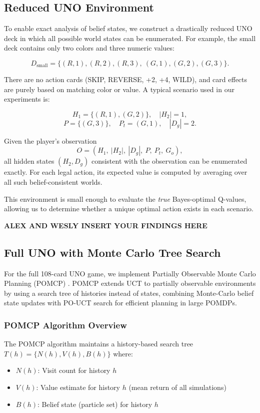 \documentclass[journal,transmag]{IEEEtran}
\begin{document}
\subsection{Reduced UNO Environment}

To enable exact analysis of belief states, we construct a drastically
reduced UNO deck in which all possible world states can be enumerated.
For example, the small deck contains only two colors and three numeric values:

\[
D_{\text{small}} =
\{(R,1), (R,2), (R,3),\ (G,1), (G,2), (G,3)\}.
\]

There are no action cards (SKIP, REVERSE, +2, +4, WILD), and card effects
are purely based on matching color or value. A typical scenario used in
our experiments is:

\[
H_1 = \{(R,1), (G,2)\},\quad |H_2| = 1,
\]
\[
P = \{(G,3)\},\quad P_t = (G,1),\quad |D_g| = 2.
\]

Given the player's observation
\[
O = (H_1,\ |H_2|,\ |D_g|,\ P,\ P_t,\ G_o),
\]
all hidden states \((H_2, D_g)\) consistent with the observation can be
enumerated exactly. For each legal action, its expected value is computed
by averaging over all such belief-consistent worlds.

This environment is small enough to evaluate the \emph{true}
Bayes-optimal Q-values, allowing us to determine whether a unique
optimal action exists in each scenario.

\textbf{ALEX AND WESLY INSERT YOUR FINDINGS HERE}


\subsection{Full UNO with Monte Carlo Tree Search}

For the full 108-card UNO game, we implement Partially Observable Monte Carlo Planning (POMCP) \cite{silver2011monte}. POMCP extends UCT to partially observable environments by using a search tree of histories instead of states, combining Monte-Carlo belief state updates with PO-UCT search for efficient planning in large POMDPs.\\

\subsubsection{POMCP Algorithm Overview}

The POMCP algorithm maintains a history-based search tree $T(h) = \{N(h), V(h), B(h)\}$ where:
\begin{itemize}
    \item $N(h)$: Visit count for history $h$
    \item $V(h)$: Value estimate for history $h$ (mean return of all simulations)
    \item $B(h)$: Belief state (particle set) for history $h$
\end{itemize} \\
\end{document}
